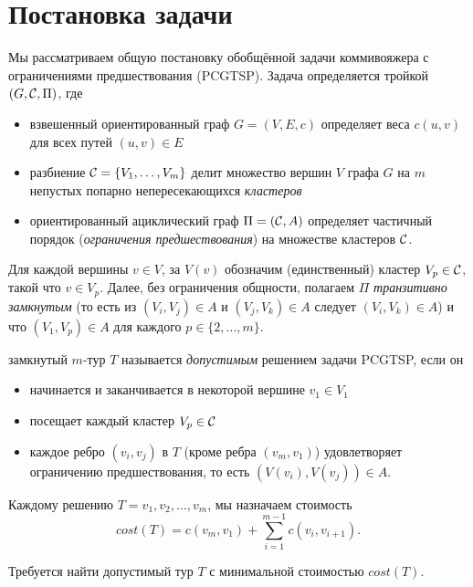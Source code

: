 \section{Постановка задачи}\label{sec:PS}
Мы рассматриваем общую постановку обобщённой задачи коммивояжера
с ограничениями предшествования
(PCGTSP). 
Задача определяется тройкой
$(G,\mathcal{C},\Pi)$, 
где
\begin{itemize}
	\item
	взвешенный ориентированный граф
	$G=(V,E,c)$
	определяет веса 
	$c(u,v)$
	для всех путей
	$(u,v)\in E$
	\item
	разбиение
	$\mathcal{C}=\{V_1,\ldots,V_m\}$
	делит множество вершин
	$V$ графа $G$ на $m$ 
	непустых попарно непересекающихся 
	{\it кластеров}
	\item
	ориентированный ациклический граф 
	$ \Pi = (\mathcal{C}, A) $ 
	определяет частичный порядок 
	(\textit{ограничения предшествования}) 
	на множестве кластеров $ \mathcal{C} $.
\end{itemize}

Для каждой вершины 
$v\in V$, за $V(v)$ 
обозначим (единственный) кластер 
$V_p\in\mathcal{C}$, 
такой что
$v\in V_p$. 
Далее,
без ограничения общности,
полагаем
$\Pi$ 
\textit{транзитивно замкнутым} 
(то есть из $(V_i,V_j)\in A$ и $(V_j,V_k)\in A$ следует $(V_i,V_k)\in A$) 
и что
$(V_1,V_p)\in A$ для каждого $p\in\{2,\ldots,m\}$.

замкнутый
$m$-тур $T$ 
называется \textit{допустимым} 
решением задачи PCGTSP, 
если он
\begin{itemize}
	\item
	начинается и заканчивается в некоторой вершине $v_1\in V_1$
	\item
	посещает каждый кластер $V_p\in\mathcal{C}$
	\item
	каждое ребро
	$(v_i, v_j)$ в $T$ 
	(кроме ребра $(v_m,v_1)$) 
	удовлетворяет ограничению предшествования,
	то есть
	 $(V(v_i),V(v_j))\in A$.
\end{itemize} 

Каждому решению
$T=v_1, v_2, \ldots, v_m$,
мы назначаем стоимость
$$
	cost(T) = c(v_m,v_1) + \sum_{i=1}^{m-1} c(v_i,v_{i+1}). 
$$ 

Требуется найти допустимый тур 
$ T $ 
с минимальной стоимостью $ cost (T) $.
